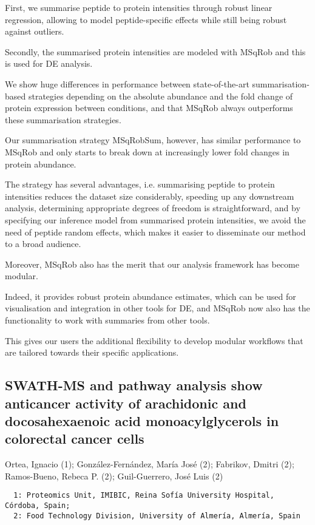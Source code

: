 {First, we summarise peptide to protein intensities through robust linear regression, allowing to model peptide-specific effects while still being robust against outliers.

Secondly, the summarised protein intensities are modeled with MSqRob and this is used for DE analysis.  

We show huge differences in performance between state-of-the-art summarisation-based strategies depending on the absolute abundance and the fold change of protein expression between conditions, and that MSqRob always outperforms these summarisation strategies.

Our summarisation strategy MSqRobSum, however, has similar performance to MSqRob and only starts to break down at increasingly lower fold changes in protein abundance.

The strategy has several advantages, i.e. summarising peptide to protein intensities reduces the dataset size considerably, speeding up any downstream analysis, determining appropriate degrees of freedom is straightforward, and by specifying our inference model from summarised protein intensities, we avoid the need of peptide random effects, which makes it easier to disseminate our method to a broad audience.

Moreover, MSqRob also has the merit that our analysis framework has become modular.

Indeed, it provides robust protein abundance estimates, which can be used for visualisation and integration in other tools for DE, and MSqRob now also has the functionality to work with summaries from other tools.

This gives our users the additional flexibility to develop modular workflows that are tailored towards their specific applications.


\subsection*{\color{eubicRed} SWATH-MS and pathway analysis show anticancer activity of arachidonic and docosahexaenoic acid monoacylglycerols in colorectal cancer cells}
{\color{eubicGray}Ortea, Ignacio (1);
González-Fernández, María José (2);
Fabrikov, Dmitri (2);
Ramos-Bueno, Rebeca P. (2);
Guil-Guerrero, José Luis (2)}
{\color{eubicGray}\begin{verbatim}
  1: Proteomics Unit, IMIBIC, Reina Sofía University Hospital, Córdoba, Spain;
  2: Food Technology Division, University of Almería, Almería, Spain
\end{verbatim}}

}
